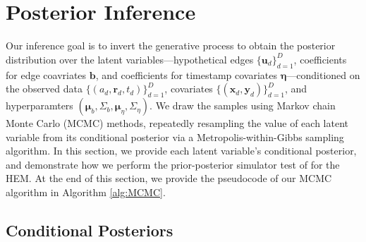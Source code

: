 \documentclass[ba]{imsart}
\numberwithin{equation}{section}
\theoremstyle{plain}
\begin{document}
\section{Posterior Inference}\label{sec:inference}
Our inference goal is to invert the generative process to obtain the posterior distribution over the latent variables---hypothetical edges $\{\boldsymbol{u}_d\}_{d=1}^D$, coefficients for edge coavriates $\boldsymbol{b}$, and coefficients for timestamp covariates $\boldsymbol{\eta}$---conditioned on the observed data $\{(a_d, \boldsymbol{r}_d, t_d)\}_{d=1}^D$, covariates $\{(\boldsymbol{x}_d, \boldsymbol{y}_d)\}_{d=1}^D$, and hyperparamters $(\boldsymbol{\mu}_b, \Sigma_b, \boldsymbol{\mu}_\eta, \Sigma_\eta)$. We draw the samples using Markov chain Monte Carlo (MCMC) methods, repeatedly resampling the value of each latent variable from its conditional posterior via a Metropolis-within-Gibbs sampling algorithm. In this section, we provide each latent variable's conditional posterior, and demonstrate how we perform the prior-posterior simulator test of \cite{geweke2004getting} for the HEM. At the end of this section, we provide the pseudocode of our MCMC algorithm in Algorithm \ref{alg:MCMC}.

\subsection{Conditional Posteriors}\label{subsec:conditionaldist}
\end{document}
